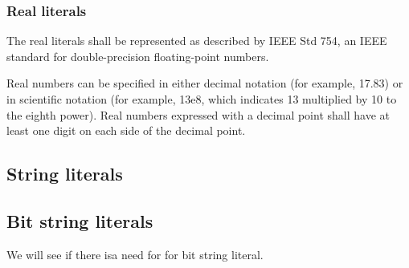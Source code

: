 \subsubsection{Real literals}

The real literals shall be represented as described by IEEE Std 754, an IEEE standard for double-precision floating-point numbers.

Real numbers can be specified in either decimal notation (for example, 17.83) or in scientific notation (for example, 13e8, which indicates 13 multiplied by 10 to the eighth power).
Real numbers expressed with a decimal point shall have at least one digit on each side of the decimal point.

\subsection{String literals}

\subsection{Bit string literals}

We will see if there isa need for for bit string literal.
